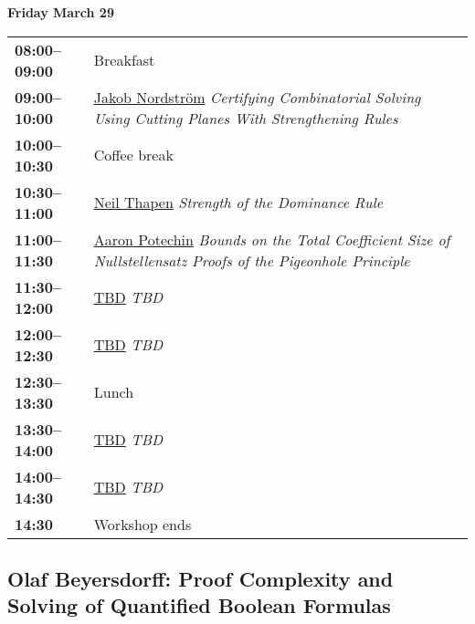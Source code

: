 \documentclass[11pt]{article}
\newcommand{\scheduletablewidth}{5.06in}
\begin{document}
\noindent\begin{minipage}{\textwidth}
\begin{center} {\bf\large Friday March 29} \end{center}
\begin{tabular}{ p{0.9in} p{\scheduletablewidth} }

{\bf 08:00--09:00}  & Breakfast\\

{\bf 09:00--10:00} & \hyperref[Nordstrom]{Jakob Nordstr\"{o}m}
{\em Certifying Combinatorial Solving Using Cutting Planes With Strengthening Rules} \\

{\bf 10:00--10:30} & {Coffee break} \\

{\bf 10:30--11:00} & \hyperref[Thapen2]{Neil Thapen}
{\em Strength of the Dominance Rule} \\

{\bf 11:00--11:30} & \hyperref[Potechin]{Aaron Potechin}
{\em Bounds on the Total Coefficient Size of Nullstellensatz Proofs of the Pigeonhole Principle} \\

{\bf 11:30--12:00} & \hyperref[TBDFri1130]{TBD}
{\em TBD} \\

{\bf 12:00--12:30} & \hyperref[TBDFri1200]{TBD}
{\em TBD} \\



{\bf 12:30--13:30
} &  Lunch\\

{\bf 13:30--14:00} &  \hyperref[TBDFri1400]{TBD}
{\em TBD} \\

{\bf 14:00--14:30} & \hyperref[TBDFri1400]{TBD}
{\em TBD} \\

{\bf 14:30%
} & Workshop ends \\
\end{tabular}
\end{minipage}


\pagebreak

\subsection*{Olaf Beyersdorff: Proof Complexity and Solving of Quantified Boolean Formulas}\label{Beyersdorff}
\end{document}
